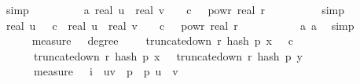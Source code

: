 \begin{isabellebody}
\ simp{\isacharplus}{\kern0pt}\isanewline
\ \ \ \ \ \ \isamarkupfalse%
\ \isamarkupfalse%
\ a{\isacharunderscore}{\kern0pt}{}{\isacharcolon}{\kern0pt}\ {\isachardoublequoteopen}{\isasymbar}real\ u\ {\isacharminus}{\kern0pt}\ real\ v{\isasymbar}\ {\isasymle}\ {}\ {\isacharasterisk}{\kern0pt}\ c\ {\isacharasterisk}{\kern0pt}\ {}\ powr\ {\isacharparenleft}{\kern0pt}{\isacharminus}{\kern0pt}real\ r{\isacharparenright}{\kern0pt}{\isachardoublequoteclose}\isanewline
\ \ \ \ \ \ \ \ \isamarkupfalse%
\ simp\isanewline
\isanewline
\ \ \ \ \ \ \isamarkupfalse%
\ {\isachardoublequoteopen}real\ u\ {\isasymle}\ {}{\isacharasterisk}{\kern0pt}\ c\ {\isasymand}\ {\isasymbar}real\ u\ {\isacharminus}{\kern0pt}\ real\ v{\isasymbar}\ {\isasymle}\ {}\ {\isacharasterisk}{\kern0pt}\ c\ {\isacharasterisk}{\kern0pt}\ {}\ powr\ {\isacharparenleft}{\kern0pt}{\isacharminus}{\kern0pt}real\ r{\isacharparenright}{\kern0pt}{\isachardoublequoteclose}\ \isanewline
\ \ \ \ \ \ \ \ \isamarkupfalse%
\ a{\isacharunderscore}{\kern0pt}{}\ a{\isacharunderscore}{\kern0pt}{}\ \isamarkupfalse%
\ simp\isanewline
\ \ \ \ \isamarkupfalse%
\isanewline
\isanewline
\ \ \ \ \isamarkupfalse%
\ {\isachardoublequoteopen}measure\ {\isasymOmega}\ {\isacharbraceleft}{\kern0pt}{\isasymomega}{\isachardot}{\kern0pt}\ degree\ {\isasymomega}\ {\isasymge}\ {}\ {\isasymand}\ truncate{\isacharunderscore}{\kern0pt}down\ r\ {\isacharparenleft}{\kern0pt}hash\ p\ x\ {\isasymomega}{\isacharparenright}{\kern0pt}\ {\isasymle}\ c\ {\isasymand}\isanewline
\ \ \ \ \ \ truncate{\isacharunderscore}{\kern0pt}down\ r\ {\isacharparenleft}{\kern0pt}hash\ p\ x\ {\isasymomega}{\isacharparenright}{\kern0pt}\ {\isacharequal}{\kern0pt}\ truncate{\isacharunderscore}{\kern0pt}down\ r\ {\isacharparenleft}{\kern0pt}hash\ p\ y\ {\isasymomega}{\isacharparenright}{\kern0pt}{\isacharbraceright}{\kern0pt}\ {\isasymle}\isanewline
\ \ \ \ \ \ measure\ {\isasymOmega}\ {\isacharparenleft}{\kern0pt}{\isasymUnion}\ i\ {\isasymin}\ {\isacharbraceleft}{\kern0pt}{\isacharparenleft}{\kern0pt}u{\isacharcomma}{\kern0pt}v{\isacharparenright}{\kern0pt}\ {\isasymin}\ {\isacharbraceleft}{\kern0pt}{}{\isachardot}{\kern0pt}{\isachardot}{\kern0pt}{\isacharless}{\kern0pt}p{\isacharbraceright}{\kern0pt}\ {\isasymtimes}\ {\isacharbraceleft}{\kern0pt}{}{\isachardot}{\kern0pt}{\isachardot}{\kern0pt}{\isacharless}{\kern0pt}p{\isacharbraceright}{\kern0pt}{\isachardot}{\kern0pt}\ u\ {\isasymnoteq}\ v\ {\isasymand}\isanewline

\end{isabellebody}
